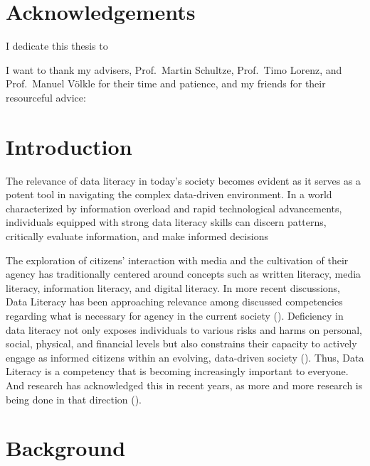 \documentclass[
  12pt,
  a4paper,
  twoside]{article}
\begin{document}
\section*{Acknowledgements}\label{acknowledgements}

I dedicate this thesis to

I want to thank my advisers, Prof.~Martin Schultze, Prof.~Timo Lorenz,
and Prof.~Manuel Völkle for their time and patience, and my friends for
their resourceful advice:

\newpage\null\thispagestyle{empty}\newpage

\section{Introduction}\label{introduction}

The relevance of data literacy in today's society becomes evident as it
serves as a potent tool in navigating the complex data-driven
environment. In a world characterized by information overload and rapid
technological advancements, individuals equipped with strong data
literacy skills can discern patterns, critically evaluate information,
and make informed decisions

The exploration of citizens' interaction with media and the cultivation
of their agency has traditionally centered around concepts such as
written literacy, media literacy, information literacy, and digital
literacy. In more recent discussions, Data Literacy has been approaching
relevance among discussed competencies regarding what is necessary for
agency in the current society (). Deficiency in data literacy not only exposes individuals to
various risks and harms on personal, social, physical, and financial
levels but also constrains their capacity to actively engage as informed
citizens within an evolving, data-driven society
(). Thus, Data Literacy is a
competency that is becoming increasingly important to everyone. And
research has acknowledged this in recent years, as more and more
research is being done in that direction ().

\section{Background}\label{background}
\end{document}
